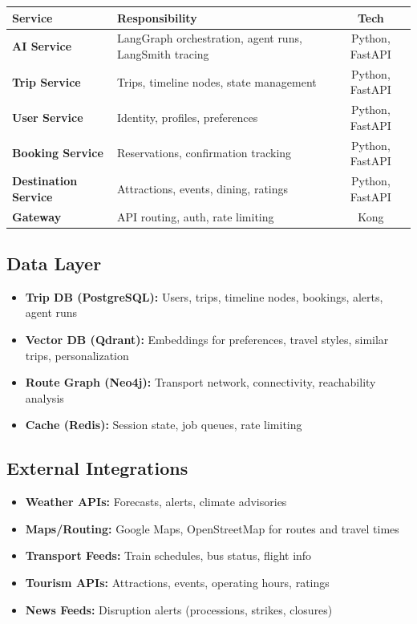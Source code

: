 \documentclass[11pt]{article}
\begin{document}
\begin{table}[H]\centering\small
\begin{tabular}{|l|p{2.5in}|c|}
\hline
\textbf{Service} & \textbf{Responsibility} & \textbf{Tech} \\
\hline
\textbf{AI Service} & LangGraph orchestration, agent runs, LangSmith tracing & Python, FastAPI \\
\hline
\textbf{Trip Service} & Trips, timeline nodes, state management & Python, FastAPI \\
\hline
\textbf{User Service} & Identity, profiles, preferences & Python, FastAPI \\
\hline
\textbf{Booking Service} & Reservations, confirmation tracking & Python, FastAPI \\
\hline
\textbf{Destination Service} & Attractions, events, dining, ratings & Python, FastAPI \\
\hline
\textbf{Gateway} & API routing, auth, rate limiting & Kong \\
\hline
\end{tabular}
\end{table}

\subsection{Data Layer}

\begin{itemize}
    \item \textbf{Trip DB (PostgreSQL):} Users, trips, timeline nodes, bookings, alerts, agent runs
    \item \textbf{Vector DB (Qdrant):} Embeddings for preferences, travel styles, similar trips, personalization
    \item \textbf{Route Graph (Neo4j):} Transport network, connectivity, reachability analysis
    \item \textbf{Cache (Redis):} Session state, job queues, rate limiting
\end{itemize}

\subsection{External Integrations}

\begin{itemize}
    \item \textbf{Weather APIs:} Forecasts, alerts, climate advisories
    \item \textbf{Maps/Routing:} Google Maps, OpenStreetMap for routes and travel times
    \item \textbf{Transport Feeds:} Train schedules, bus status, flight info
    \item \textbf{Tourism APIs:} Attractions, events, operating hours, ratings
    \item \textbf{News Feeds:} Disruption alerts (processions, strikes, closures)
\end{itemize}
\end{document}
